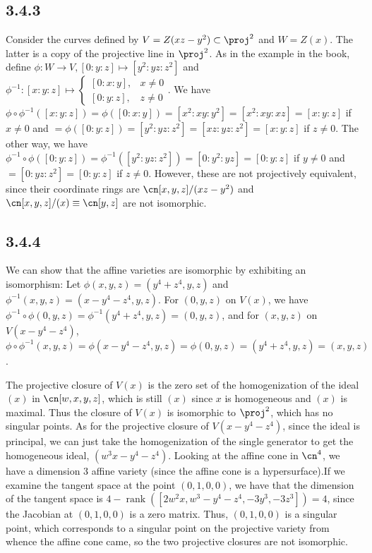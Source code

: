 \documentclass{article}
\DeclareMathOperator{\rk}{rank}
\begin{document}
\subsection*{3.4.3}
Consider the curves defined by $V=Z(xz-y^2)\subset\proj^2$ and $W=Z(x)$. The latter is a copy of the projective line in $\proj^2$. As in the example in the book, define $\phi:W\to V, [0:y:z]\mapsto [y^2:yz:z^2]$ and $\phi^{-1}:[x:y:z]\mapsto
\begin{cases}
    [0:x:y],&x\neq0\\
    [0:y:z],&z\neq0
\end{cases}$. 
We have $\phi\circ\phi^{-1}([x:y:z])=\phi([0:x:y])=[x^2:xy:y^2]=[x^2:xy:xz]=[x:y:z]$ if $x\neq0$ and $=\phi([0:y:z])=[y^2:yz:z^2]=[xz:yz:z^2]=[x:y:z]$ if $z\neq0$. The other way, we have $\phi^{-1}\circ\phi([0:y:z])=\phi^{-1}([y^2:yz:z^2])=[0:y^2:yz]=[0:y:z]$ if $y\neq0$ and $=[0:yz:z^2]=[0:y:z]$ if $z\neq0$. However, these are not projectively equivalent, since their coordinate rings are $\cn[x,y,z]/(xz-y^2)$ and $\cn[x,y,z]/(x)\equiv\cn[y,z]$ are not isomorphic.
\subsection*{3.4.4}
We can show that the affine varieties are isomorphic by exhibiting an isomorphism: Let $\phi(x,y,z)=(y^4+z^4,y,z)$ and $\phi^{-1}(x,y,z)=(x-y^4-z^4,y,z)$. For $(0,y,z)$ on $V(x)$, we have $\phi^{-1}\circ\phi(0,y,z)=\phi^{-1}(y^4+z^4,y,z)=(0,y,z)$, and for $(x,y,z)$ on $V(x-y^4-z^4)$, $\phi\circ\phi^{-1}(x,y,z)=\phi(x-y^4-z^4,y,z)=\phi(0,y,z)=(y^4+z^4,y,z)=(x,y,z)$.

The projective closure of $V(x)$ is the zero set of the homogenization of the ideal $(x)$ in $\cn[w,x,y,z]$, which is still $(x)$ since $x$ is homogeneous and $(x)$ is maximal. Thus the closure of $V(x)$ is isomorphic to $\proj^2$, which has no singular points. As for the projective closure of $V(x-y^4-z^4)$, since the ideal is principal, we can just take the homogenization of the single generator to get the homogeneous ideal, $(w^3x-y^4-z^4)$. Looking at the affine cone in $\cn^4$, we have a dimension 3 affine variety (since the affine cone is a hypersurface).If we examine the tangent space at the point $(0,1,0,0)$, we have that the dimension of the tangent space is $4-\rk([2w^2x,w^3-y^4-z^4,-3y^3,-3z^3])=4$, since the Jacobian at $(0,1,0,0)$ is a zero matrix. Thus, $(0,1,0,0)$ is a singular point, which corresponds to a singular point on the projective variety from whence the affine cone came, so the two projective closures are not isomorphic.
\end{document}
